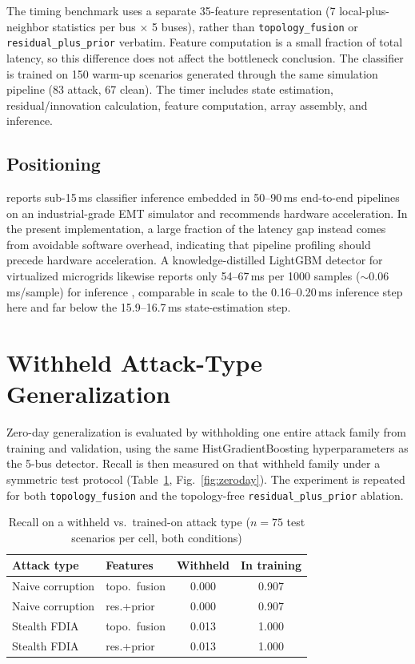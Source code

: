 \documentclass[conference]{IEEEtran}
\begin{document}
The timing benchmark uses a separate 35-feature representation (7 local-plus-neighbor statistics per bus $\times$ 5 buses), rather than \texttt{topology\_fusion} or \texttt{residual\_plus\_prior} verbatim. Feature computation is a small fraction of total latency, so this difference does not affect the bottleneck conclusion. The classifier is trained on 150 warm-up scenarios generated through the same simulation pipeline (83 attack, 67 clean). The timer includes state estimation, residual/innovation calculation, feature computation, array assembly, and inference.

\subsection{Positioning}
\cite{abukhousa2026latency} reports sub-15\,ms classifier inference embedded in 50--90\,ms end-to-end pipelines on an industrial-grade EMT simulator and recommends hardware acceleration. In the present implementation, a large fraction of the latency gap instead comes from avoidable software overhead, indicating that pipeline profiling should precede hardware acceleration. A knowledge-distilled LightGBM detector for virtualized microgrids likewise reports only 54--67\,ms per 1000 samples ($\sim$0.06\,ms/sample) for inference \cite{ogiesoba2026cyberattack}, comparable in scale to the 0.16--0.20\,ms inference step here and far below the 15.9--16.7\,ms state-estimation step.

\section{Withheld Attack-Type Generalization}
\label{sec:zeroday}

Zero-day generalization is evaluated by withholding one entire attack family from training and validation, using the same HistGradientBoosting hyperparameters as the 5-bus detector. Recall is then measured on that withheld family under a symmetric test protocol (Table~\ref{tab:zeroday}, Fig.~\ref{fig:zeroday}). The experiment is repeated for both \texttt{topology\_fusion} and the topology-free \texttt{residual\_plus\_prior} ablation.

\begin{table}[t]
\centering
\caption{Recall on a withheld vs.\ trained-on attack type ($n{=}75$ test scenarios per cell, both conditions)}
\label{tab:zeroday}
\footnotesize
\begin{tabular}{@{}llcc@{}}
\toprule
Attack type & Features & Withheld & In training \\
\midrule
Naive corruption & topo.\ fusion & 0.000 & 0.907 \\
Naive corruption & res.+prior & 0.000 & 0.907 \\
Stealth FDIA & topo.\ fusion & 0.013 & 1.000 \\
Stealth FDIA & res.+prior & 0.013 & 1.000 \\
\bottomrule
\end{tabular}
\end{table}
\end{document}
